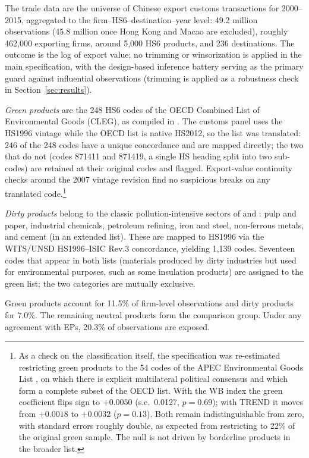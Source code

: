 \documentclass[12pt]{article}
\begin{document}
The trade data are the universe of Chinese export customs transactions for 2000--2015,
aggregated to the firm--HS6--destination--year level: 49.2 million observations (45.8
million once Hong Kong and Macao are excluded), roughly 462{,}000 exporting firms,
around 5{,}000 HS6 products, and 236 destinations. The outcome is the log of export
value; no trimming or winsorization is applied in the main specification, with the
design-based inference battery serving as the primary guard against influential
observations (trimming is applied as a robustness check in Section~\ref{sec:results}).

\emph{Green products} are the 248 HS6 codes of the OECD Combined List of Environmental
Goods (CLEG), as compiled in \citet{sauvage2014}. The customs panel uses the HS1996
vintage while the OECD list is native HS2012, so the list was translated: 246 of the 248
codes have a unique concordance and are mapped directly; the two that do not (codes
871411 and 871419, a single HS heading split into two sub-codes) are retained at their
original codes and flagged. Export-value continuity checks around the 2007 vintage
revision find no suspicious breaks on any translated code.\footnote{As a check on the
classification itself, the specification was re-estimated restricting green products to
the 54 codes of the APEC Environmental Goods List \citep{sauvage2014}, on which there is
explicit multilateral political consensus and which form a complete subset of the OECD
list. With the WB index the green coefficient flips sign to $+0.0050$ (s.e.\ 0.0127,
$p=0.69$); with TREND it moves from $+0.0018$ to $+0.0032$ ($p=0.13$). Both remain
indistinguishable from zero, with standard errors roughly double, as expected from
restricting to 22\% of the original green sample. The null is not driven by borderline
products in the broader list.}

\emph{Dirty products} belong to the classic pollution-intensive sectors of
\citet{mani1998} and \citet{low1992}: pulp and paper, industrial chemicals, petroleum
refining, iron and steel, non-ferrous metals, and cement (in an extended list). These are
mapped to HS1996 via the WITS/UNSD HS1996--ISIC Rev.3 concordance, yielding 1{,}139
codes. Seventeen codes that appear in both lists (materials produced by dirty industries
but used for environmental purposes, such as some insulation products) are assigned to
the green list; the two categories are mutually exclusive.

Green products account for 11.5\% of firm-level observations and dirty products for
7.0\%. The remaining neutral products form the comparison group. Under any agreement with
EPs, 20.3\% of observations are exposed.
\end{document}
